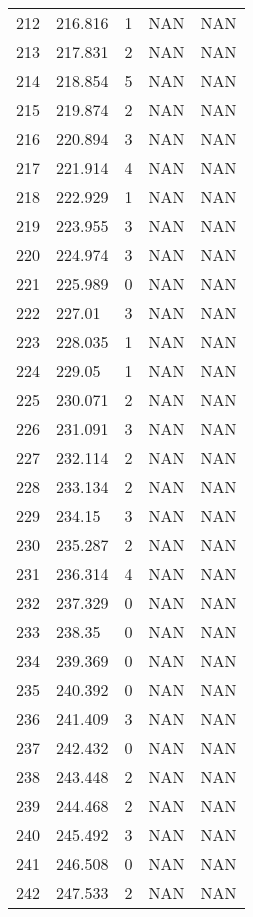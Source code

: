 \documentclass{article}
\begin{document}
\begin{longtable}{@{}lllll@{}}
					212 & 216.816 & 1     & NAN   & NAN   \\
					213 & 217.831 & 2     & NAN   & NAN   \\
					214 & 218.854 & 5     & NAN   & NAN   \\
					215 & 219.874 & 2     & NAN   & NAN   \\
					216 & 220.894 & 3     & NAN   & NAN   \\
					217 & 221.914 & 4     & NAN   & NAN   \\
					218 & 222.929 & 1     & NAN   & NAN   \\
					219 & 223.955 & 3     & NAN   & NAN   \\
					220 & 224.974 & 3     & NAN   & NAN   \\
					221 & 225.989 & 0     & NAN   & NAN   \\
					222 & 227.01  & 3     & NAN   & NAN   \\
					223 & 228.035 & 1     & NAN   & NAN   \\
					224 & 229.05  & 1     & NAN   & NAN   \\
					225 & 230.071 & 2     & NAN   & NAN   \\
					226 & 231.091 & 3     & NAN   & NAN   \\
					227 & 232.114 & 2     & NAN   & NAN   \\
					228 & 233.134 & 2     & NAN   & NAN   \\
					229 & 234.15  & 3     & NAN   & NAN   \\
					230 & 235.287 & 2     & NAN   & NAN   \\
					231 & 236.314 & 4     & NAN   & NAN   \\
					232 & 237.329 & 0     & NAN   & NAN   \\
					233 & 238.35  & 0     & NAN   & NAN   \\
					234 & 239.369 & 0     & NAN   & NAN   \\
					235 & 240.392 & 0     & NAN   & NAN   \\
					236 & 241.409 & 3     & NAN   & NAN   \\
					237 & 242.432 & 0     & NAN   & NAN   \\
					238 & 243.448 & 2     & NAN   & NAN   \\
					239 & 244.468 & 2     & NAN   & NAN   \\
					240 & 245.492 & 3     & NAN   & NAN   \\
					241 & 246.508 & 0     & NAN   & NAN   \\
					242 & 247.533 & 2     & NAN   & NAN   \\

\end{longtable}
\end{document}
